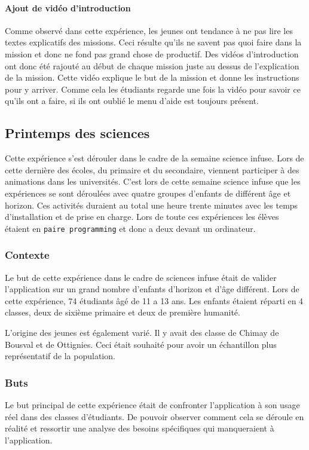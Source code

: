\paragraph{Ajout de vidéo d'introduction}
Comme observé dans cette expérience, les jeunes ont tendance à ne pas lire les textes explicatifs des missions. Ceci résulte qu'ils ne savent pas quoi faire dans la mission et donc ne fond pas grand chose de productif. Des vidéos d'introduction ont donc été rajouté au début de chaque mission juste au dessus de l'explication de la mission. Cette vidéo explique le but de la mission et donne les instructions pour y arriver. Comme cela les étudiants regarde une fois la vidéo pour savoir ce qu'ils ont a faire, si ils ont oublié le menu d'aide est toujours présent.


\subsection{Printemps des sciences}
Cette expérience s'est dérouler dans le cadre de la semaine science infuse. Lors de cette dernière des écoles, du primaire et du secondaire, viennent participer à des animations dans les universités. C'est lors de cette semaine science infuse que les expériences se sont déroulées avec quatre groupes d'enfants de différent âge et horizon. Ces activités duraient au total une heure trente minutes avec les temps d'installation et de prise en charge. Lors de toute ces expériences les élèves étaient en \texttt{paire programming} et donc a deux devant un ordinateur.

\subsubsection{Contexte}
Le but de cette expérience dans le cadre de sciences infuse était de valider l'application sur un grand nombre d'enfants d'horizon et d'âge différent. Lors de cette expérience, 74 étudiants âgé de 11 a 13 ans. Les enfants étaient réparti en 4 classes, deux de sixième primaire et deux de première humanité.

L'origine des jeunes est également varié. Il y avait des classe de Chimay de Bousval et de Ottignies. Ceci était souhaité pour avoir un échantillon plus représentatif de la population.

\subsubsection{Buts}
Le but principal de cette expérience était de confronter l'application à son usage réel dans des classes d'étudiants. De pouvoir observer comment cela se déroule en réalité et ressortir une analyse des besoins spécifiques qui manqueraient à l'application.


